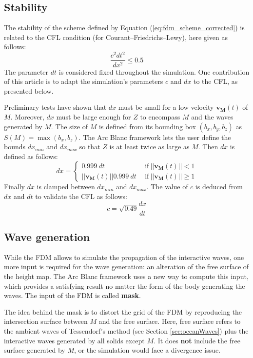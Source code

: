 \documentclass[final]{jcgt}
\def\Framework{The Arc Blanc framework\xspace}
\begin{document}
\subsection{Stability}
\label{subsec:stability}
The stability of the scheme defined by Equation (\ref{eq:fdm_scheme_corrected}) is related to the CFL condition (for Courant–Friedrichs–Lewy), here given as follows:
\begin{equation}
	\frac{c^2dt^2}{dx^2}\leq 0.5
\end{equation}
The parameter $dt$ is considered fixed throughout the simulation.
One contribution of this article is to adapt the simulation's parameters $c$ and $dx$ to the CFL, as presented below.

Preliminary tests have shown that $dx$ must be small for a low velocity $\mathbf{v_M}(t)$ of $M$.
Moreover, $dx$ must be large enough for $Z$ to encompass $M$ and the waves generated by $M$.
The size of $M$ is defined from its bounding box $(b_x, b_y, b_z)$ as $S(M)=\max(b_x, b_z)$.
\Framework lets the user define the bounds $dx_{min}$ and $dx_{max}$ so that $Z$ is at least twice as large as $M$.
Then $dx$ is defined as follows:
\begin{equation}
	dx =
	\begin{cases}
		0.999~dt                    & ~~ \text{if}~||\mathbf{v_M}(t)||<1    \\
		||\mathbf{v_M}(t)||0.999~dt & ~~ \text{if}~||\mathbf{v_M}(t)||\geq1
	\end{cases}
\end{equation}
Finally $dx$ is clamped between $dx_{min}$ and $dx_{max}$.
The value of $c$ is deduced from $dx$ and $dt$ to validate the CFL as follows:
\begin{equation}
	c = \sqrt{0.49} \frac{dx}{dt}
\end{equation}

\subsection{Wave generation}
\label{subsec:mask}
While the FDM allows to simulate the propagation of the interactive waves, one more input is required for the wave generation: an alteration of the free surface of the height map.
\Framework uses a new way to compute this input, which provides a satisfying result no matter the form of the body generating the waves.
The input of the FDM is called \textbf{mask}.

The idea behind the mask is to distort the grid of the FDM by reproducing the intersection surface between $M$ and the free surface.
Here, free surface refers to the ambient waves of Tessendorf's method (see Section \ref{sec:oceanWaves}) plus the interactive waves generated by all solids except $M$.
It does \textbf{not} include the free surface generated by $M$, or the simulation would face a divergence issue.
\end{document}
